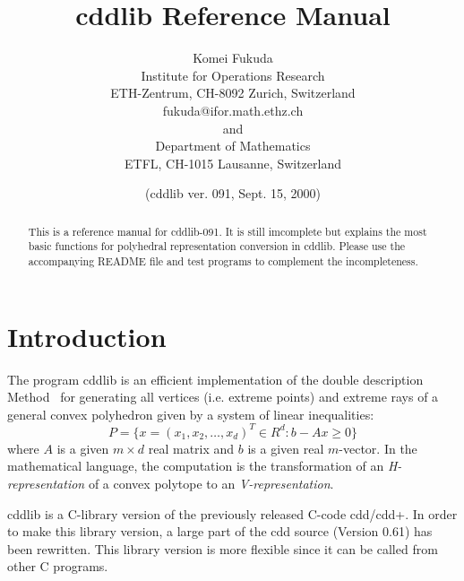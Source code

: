 \documentclass[11pt]{article}
\newcommand {\0} {{\bf 0}}
\begin{document}
\title{cddlib Reference Manual}
\author{Komei Fukuda \\
Institute for Operations Research\\
ETH-Zentrum, CH-8092 Zurich, Switzerland\\
fukuda@ifor.math.ethz.ch \\and\\
Department of Mathematics\\
ETFL, CH-1015 Lausanne, Switzerland}
\date{ (cddlib ver. 091,  Sept. 15, 2000)}

\maketitle
\begin{abstract}
This is a reference manual for cddlib-091.  
It is still imcomplete but explains the most basic functions for polyhedral
representation conversion in cddlib.  
Please use the accompanying README file and test programs to complement the incompleteness.
\end{abstract}

\section{Introduction} \label{INTRODUCTION}

The program  cddlib  is an efficient implementation \cite{fp-ddmr-96}  of 
the double description Method~\cite{mrtt-ddm-53}
for generating  all vertices (i.e. extreme points)
and extreme rays of a general 
convex polyhedron given by 
a system of linear inequalities:
\[
   P = \{ x=(x_1, x_2, \ldots, x_d)^T \in R^{d}:  b - A  x  \ge 0 \}
\]
where $A$ is a given $m \times d$ real matrix and 
$b$ is a given real $m$-vector.   In the mathematical
language, the computation is the transformation
of an {\em H-representation\/} of a convex polytope
to an {\em V-representation}.  

cddlib is a C-library version of the previously released C-code cdd/cdd+.
In order to make this library version, a large part of the cdd source
(Version 0.61) has been rewritten.
This library version is more flexible since it can be called from other
C programs.
\end{document}
